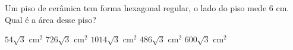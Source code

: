\noindent\parbox{\linewidth}{

Um piso de cerâmica tem forma hexagonal regular, o lado do piso mede $6$ cm. Qual é a área desse piso?

$54\sqrt{3}$ cm$^2$
$726\sqrt{3}$ cm$^2$
$1014\sqrt{3}$ cm$^2$
$486\sqrt{3}$ cm$^2$
$600\sqrt{3}$ cm$^2$



}



